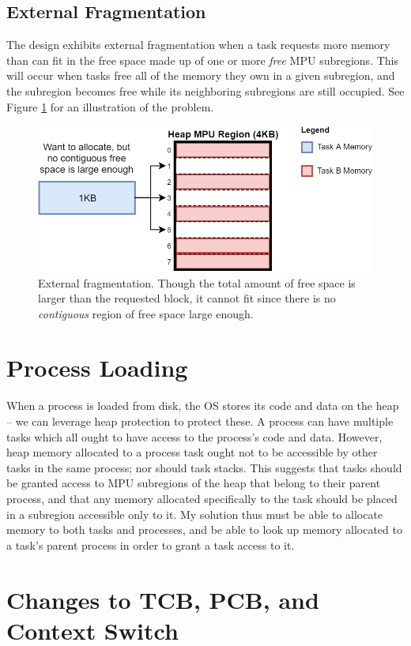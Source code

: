 \subsection{External Fragmentation}

The design exhibits external fragmentation when a task requests more memory than can fit in the free space made up of one or more \textit{free} MPU subregions. This will occur when tasks free all of the memory they own in a given subregion, and the subregion becomes free while its neighboring subregions are still occupied. See Figure \ref{fig:external_frag} for an illustration of the problem.

\begin{figure}[hbtp]
	\centering
	\includegraphics[width=0.7\linewidth]{figs/ext_frag.png}
	\caption{External fragmentation. Though the total amount of free space is larger than the requested block, it cannot fit since there is no \textit{contiguous} region of free space large enough.}
	\label{fig:external_frag}
\end{figure}

\section{Process Loading}

When a process is loaded from disk, the OS stores its code and data on the heap -- we can leverage heap protection to protect these. A process can have multiple tasks which all ought to have access to the process's code and data. However, heap memory allocated to a process task ought not to be accessible by other tasks in the same process; nor should task stacks. This suggests that tasks should be granted access to MPU subregions of the heap that belong to their parent process, and that any memory allocated specifically to the task should be placed in a subregion accessible only to it. My solution thus must be able to allocate memory to both tasks and processes, and be able to look up memory allocated to a task's parent process in order to grant a task access to it.

\section{Changes to TCB, PCB, and Context Switch}

